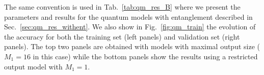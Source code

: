 \begin{table}[]
\centering
{}
\caption{Results for the first set of separable quantum models described in the text. The parenthesis in the label for the quantum models indicates the number of qubits $N$ employed.\label{tab:qm_res_A}}
\end{table}


The same convention is used in Tab.~\ref{tab:qm_res_B} where we present the parameters and results for the quantum models with entanglement described in Sec.~\ref{sec:qm_res_withent}. We also show in Fig.~\ref{fig:qm_train} the evolution of the accuracy for both the training set (left panels) and validation set (right panels). The top two panels are obtained with models with maximal output size ($M_1=16$ in this case) while the bottom panels show the results using a restricted output model with $M_1=1$.

